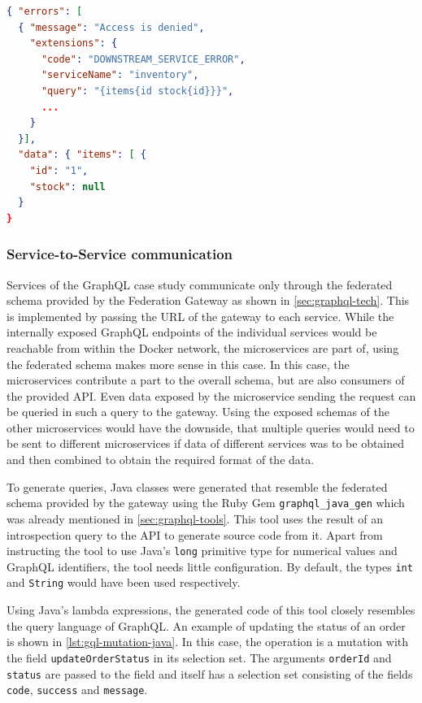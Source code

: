 \begin{lstlisting}[caption={Response to an Unauthorzed Query}, language=json, label={lst:gql-resp-unauthorized}]
{ "errors": [
  { "message": "Access is denied",
    "extensions": { 
      "code": "DOWNSTREAM_SERVICE_ERROR",
      "serviceName": "inventory",
      "query": "{items{id stock{id}}}",
      ...
    }
  }],
  "data": { "items": [ {
    "id": "1",
    "stock": null
  }
}
\end{lstlisting}

\subsubsection{Service-to-Service communication}

Services of the GraphQL case study communicate only through the federated schema provided by the Federation Gateway as shown in \autoref{sec:graphql-tech}.
This is implemented by passing the \ac{URL} of the gateway to each service.
While the internally exposed GraphQL endpoints of the individual services would be reachable from within the Docker network, the microservices are part of, using the federated schema makes more sense in this case.
In this case, the microservices contribute a part to the overall schema, but are also consumers of the provided \ac{API}.
Even data exposed by the microservice sending the request can be queried in such a query to the gateway.
Using the exposed schemas of the other microservices would have the downside, that multiple queries would need to be sent to different microservices if data of different services was to be obtained and then combined to obtain the required format of the data.

To generate queries, Java classes were generated that resemble the federated schema provided by the gateway using the Ruby Gem \texttt{graphql\_java\_gen} which was already mentioned in \autoref{sec:graphql-tools}.
This tool uses the result of an introspection query to the \ac{API} to generate source code from it.
Apart from instructing the tool to use Java's \texttt{long} primitive type for numerical values and GraphQL identifiers, the tool needs little configuration.
By default, the types \texttt{int} and \texttt{String} would have been used respectively.

Using Java's lambda expressions, the generated code of this tool closely resembles the query language of GraphQL.%
An example of updating the status of an order is shown in \autoref{lst:gql-mutation-java}.
In this case, the operation is a mutation with the field \texttt{updateOrderStatus} in its selection set.
The arguments \texttt{orderId} and \texttt{status} are passed to the field and itself has a selection set consisting of the fields \texttt{code}, \texttt{success} and \texttt{message}.

